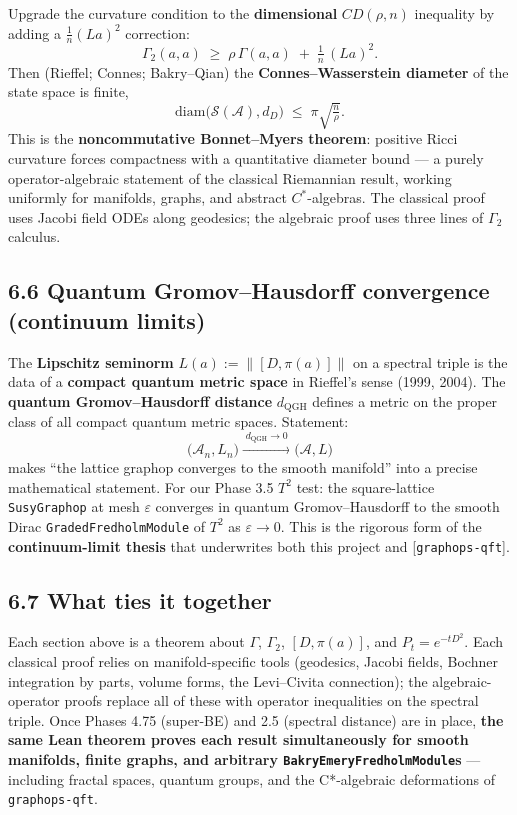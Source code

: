 \documentclass[
  11pt,
]{article}
\begin{document}
Upgrade the curvature condition to the \textbf{dimensional}
\(CD(\rho, n)\) inequality by adding a \(\tfrac{1}{n}(La)^2\)
correction: \[
\Gamma_2(a, a) \;\geq\; \rho\,\Gamma(a, a) \;+\; \tfrac{1}{n}\,(La)^2.
\] Then (Rieffel; Connes; Bakry--Qian) the \textbf{Connes--Wasserstein
diameter} of the state space is finite, \[
\mathrm{diam}\bigl(\mathcal{S}(\mathcal{A}), d_D\bigr) \;\leq\; \pi\sqrt{\tfrac{n}{\rho}}.
\] This is the \textbf{noncommutative Bonnet--Myers theorem}: positive
Ricci curvature forces compactness with a quantitative diameter bound
--- a purely operator-algebraic statement of the classical Riemannian
result, working uniformly for manifolds, graphs, and abstract
\(C^*\)-algebras. The classical proof uses Jacobi field ODEs along
geodesics; the algebraic proof uses three lines of \(\Gamma_2\)
calculus.

\subsection{6.6 Quantum Gromov--Hausdorff convergence (continuum
limits)}\label{quantum-gromovhausdorff-convergence-continuum-limits}

The \textbf{Lipschitz seminorm} \(L(a) := \|[D, \pi(a)]\|\) on a
spectral triple is the data of a \textbf{compact quantum metric space}
in Rieffel's sense (1999, 2004). The \textbf{quantum Gromov--Hausdorff
distance} \(d_{\mathrm{QGH}}\) defines a metric on the proper class of
all compact quantum metric spaces. Statement: \[
\bigl(\mathcal{A}_n, L_n\bigr) \xrightarrow{\;d_{\mathrm{QGH}} \to 0\;} \bigl(\mathcal{A}, L\bigr)
\] makes ``the lattice graphop converges to the smooth manifold'' into a
precise mathematical statement. For our Phase 3.5 \(T^2\) test: the
square-lattice \texttt{SusyGraphop} at mesh \(\varepsilon\) converges in
quantum Gromov--Hausdorff to the smooth Dirac
\texttt{GradedFredholmModule} of \(T^2\) as \(\varepsilon \to 0\). This
is the rigorous form of the \textbf{continuum-limit thesis} that
underwrites both this project and {[}\texttt{graphops-qft}{]}.

\subsection{6.7 What ties it together}\label{what-ties-it-together}

Each section above is a theorem about \(\Gamma\), \(\Gamma_2\),
\([D, \pi(a)]\), and \(P_t = e^{-tD^2}\). Each classical proof relies on
manifold-specific tools (geodesics, Jacobi fields, Bochner integration
by parts, volume forms, the Levi--Civita connection); the
algebraic-operator proofs replace all of these with operator
inequalities on the spectral triple. Once Phases 4.75 (super-BE) and 2.5
(spectral distance) are in place, \textbf{the same Lean theorem proves
each result simultaneously for smooth manifolds, finite graphs, and
arbitrary \texttt{BakryEmeryFredholmModule}s} --- including fractal
spaces, quantum groups, and the C*-algebraic deformations of
\texttt{graphops-qft}.
\end{document}
